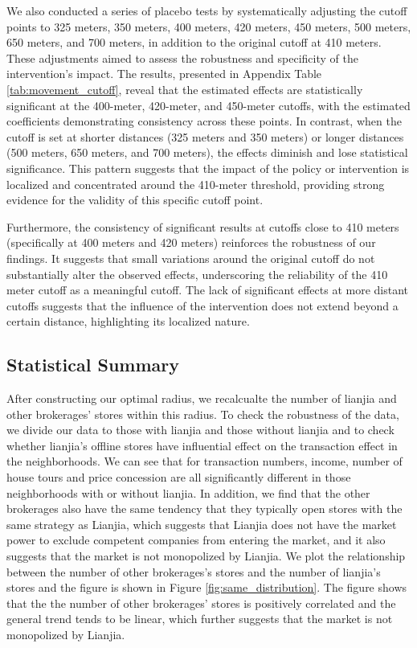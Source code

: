\documentclass[11pt]{article}
\begin{document}
We also conducted a series of placebo tests by systematically adjusting the cutoff points to 325 meters, 350 meters, 400 meters, 420 meters, 450 meters, 500 meters, 650 meters, and 700 meters, in addition to the original cutoff at 410 meters. These adjustments aimed to assess the robustness and specificity of the intervention's impact. The results, presented in Appendix Table \ref{tab:movement_cutoff}, reveal that the estimated effects are statistically significant at the 400-meter, 420-meter, and 450-meter cutoffs, with the estimated coefficients demonstrating consistency across these points. In contrast, when the cutoff is set at shorter distances (325 meters and 350 meters) or longer distances (500 meters, 650 meters, and 700 meters), the effects diminish and lose statistical significance. This pattern suggests that the impact of the policy or intervention is localized and concentrated around the 410-meter threshold, providing strong evidence for the validity of this specific cutoff point.

Furthermore, the consistency of significant results at cutoffs close to 410 meters (specifically at 400 meters and 420 meters) reinforces the robustness of our findings. It suggests that small variations around the original cutoff do not substantially alter the observed effects, underscoring the reliability of the 410 meter cutoff as a meaningful cutoff. The lack of significant effects at more distant cutoffs suggests that the influence of the intervention does not extend beyond a certain distance, highlighting its localized nature.

\subsection{Statistical Summary} \label{subsec:Statistical_Summary}

After constructing our optimal radius, we recalcualte the number of lianjia and other brokerages' stores within this radius. To check the robustness of the data, we divide our data to those with lianjia and those without lianjia and to check whether lianjia's offline stores have influential effect on the transaction effect in the neighborhoods. We can see that for transaction numbers, income, number of house tours and price concession are all significantly different in those neighborhoods with or without lianjia. In addition, we find that the other brokerages also have the same tendency that they typically open stores with the same strategy as Lianjia, which suggests that Lianjia does not have the market power to exclude competent companies from entering the market, and it also suggests that the market is not monopolized by Lianjia. We plot the relationship between the number of other brokerages's stores and the number of lianjia's stores and the figure is shown in Figure \ref{fig:same_distribution}. The figure shows that the the number of other brokerages' stores is positively correlated and the general trend tends to be linear, which further suggests that the market is not monopolized by Lianjia.
\end{document}
